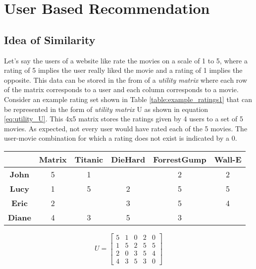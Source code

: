 
\section{User Based Recommendation}
\subsection{Idea of Similarity}
Let's say the users of a website like rate the movies on a scale of 1 to 5, where a rating of 5 implies the user really liked the movie and a rating of 1 implies the opposite. This data can be stored in the from of a \textit{utility matrix} where each row of the matrix corresponds to a user and each column corresponds to a movie. Consider an example rating set shown in Table \ref{table:example_ratings1} that can be represented in the form of \textit{utility matrix} U as shown in equation \ref{eq:utility_U}. This 4x5 matrix stores the ratings given by 4 users to a set of 5 movies. As expected, not every user would have rated each of the 5 movies. The user-movie combination for which a rating does not exist is indicated by a 0.
\begin{table*}
\centering
\begin{tabular}{|c|c|c|c|c|c|}
\hline
\textbf{} 			& \textbf{Matrix} & \textbf{Titanic} & \textbf{DieHard} & \textbf{ForrestGump} & \textbf{Wall-E}\\ 
\hline
\textbf{John} 		& 	 	5		  & 		1		 & 				    &   	2			   & 		2		\\ 
\hline
\textbf{Lucy} 		& 	 	1		  & 		5		 & 		2		    &   	5			   & 		5		\\ 
\hline
\textbf{Eric} 		& 	 	2		  & 				 & 		3		    &   	5			   & 		4		\\ 
\hline
\textbf{Diane} 		& 	 	4		  & 		3		 & 		5		    &   	3			   & 				\\ 
\hline
\end{tabular}
\caption{Example ratings}
\label{table:example_ratings1}
\end{table*}

\begin{equation} \label{eq:utility_U}
U = 
	\left[
	\begin{matrix} %
	5 & 1 & 0 & 2 & 0\\
	1 & 5 & 2 & 5 & 5\\
	2 & 0 & 3 & 5 & 4\\
	4 & 3 & 5 & 3 & 0
	\end{matrix}
	\right]
	\end{equation}
	

